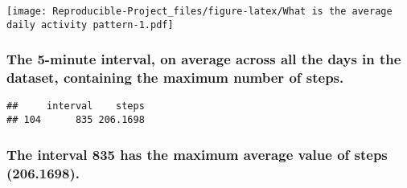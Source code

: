 \documentclass[
]{article}
\newenvironment{Shaded}{\begin{snugshade}}{\end{snugshade}}
\newcommand{\CommentTok}[1]{\textcolor[rgb]{0.56,0.35,0.01}{\textit{#1}}}
\newcommand{\DataTypeTok}[1]{\textcolor[rgb]{0.13,0.29,0.53}{#1}}
\newcommand{\KeywordTok}[1]{\textcolor[rgb]{0.13,0.29,0.53}{\textbf{#1}}}
\newcommand{\NormalTok}[1]{#1}
\newcommand{\OperatorTok}[1]{\textcolor[rgb]{0.81,0.36,0.00}{\textbf{#1}}}
\newcommand{\StringTok}[1]{\textcolor[rgb]{0.31,0.60,0.02}{#1}}
\begin{document}
\begin{Shaded}
\end{Shaded}

\texttt{[image: Reproducible-Project\_files/figure-latex/What is the average daily activity pattern-1.pdf]}

\hypertarget{the-5-minute-interval-on-average-across-all-the-days-in-the-dataset-containing-the-maximum-number-of-steps.}{%
\subsubsection{The 5-minute interval, on average across all the days in
the dataset, containing the maximum number of
steps.}\label{the-5-minute-interval-on-average-across-all-the-days-in-the-dataset-containing-the-maximum-number-of-steps.}}

\begin{Shaded}
\end{Shaded}

\begin{verbatim}
##     interval    steps
## 104      835 206.1698
\end{verbatim}

\hypertarget{the-interval-835-has-the-maximum-average-value-of-steps-206.1698.}{%
\subsubsection{The interval 835 has the maximum average value of steps
(206.1698).}\label{the-interval-835-has-the-maximum-average-value-of-steps-206.1698.}}
\end{document}
